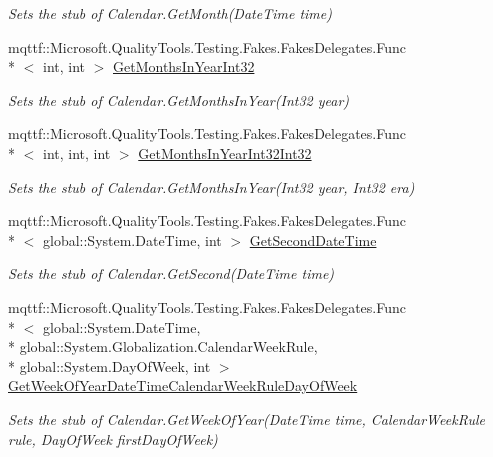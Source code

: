 \begin{DoxyCompactItemize}
\begin{DoxyCompactList}\small\item\em Sets the stub of Calendar.\-Get\-Month(\-Date\-Time time)\end{DoxyCompactList}\item 
mqttf\-::\-Microsoft.\-Quality\-Tools.\-Testing.\-Fakes.\-Fakes\-Delegates.\-Func\\*
$<$ int, int $>$ \hyperlink{class_system_1_1_globalization_1_1_fakes_1_1_stub_calendar_a66e55f25dc68ad269e2ca7e091b98267}{Get\-Months\-In\-Year\-Int32}
\begin{DoxyCompactList}\small\item\em Sets the stub of Calendar.\-Get\-Months\-In\-Year(\-Int32 year)\end{DoxyCompactList}\item 
mqttf\-::\-Microsoft.\-Quality\-Tools.\-Testing.\-Fakes.\-Fakes\-Delegates.\-Func\\*
$<$ int, int, int $>$ \hyperlink{class_system_1_1_globalization_1_1_fakes_1_1_stub_calendar_a3fb92cf91327ffaa04caa55f25961652}{Get\-Months\-In\-Year\-Int32\-Int32}
\begin{DoxyCompactList}\small\item\em Sets the stub of Calendar.\-Get\-Months\-In\-Year(\-Int32 year, Int32 era)\end{DoxyCompactList}\item 
mqttf\-::\-Microsoft.\-Quality\-Tools.\-Testing.\-Fakes.\-Fakes\-Delegates.\-Func\\*
$<$ global\-::\-System.\-Date\-Time, int $>$ \hyperlink{class_system_1_1_globalization_1_1_fakes_1_1_stub_calendar_a8a6e91ba959bb49a08e6d847e71fc9c2}{Get\-Second\-Date\-Time}
\begin{DoxyCompactList}\small\item\em Sets the stub of Calendar.\-Get\-Second(\-Date\-Time time)\end{DoxyCompactList}\item 
mqttf\-::\-Microsoft.\-Quality\-Tools.\-Testing.\-Fakes.\-Fakes\-Delegates.\-Func\\*
$<$ global\-::\-System.\-Date\-Time, \\*
global\-::\-System.\-Globalization.\-Calendar\-Week\-Rule, \\*
global\-::\-System.\-Day\-Of\-Week, int $>$ \hyperlink{class_system_1_1_globalization_1_1_fakes_1_1_stub_calendar_a8c9034c6b0a71419dec2c4434683dff3}{Get\-Week\-Of\-Year\-Date\-Time\-Calendar\-Week\-Rule\-Day\-Of\-Week}
\begin{DoxyCompactList}\small\item\em Sets the stub of Calendar.\-Get\-Week\-Of\-Year(\-Date\-Time time, Calendar\-Week\-Rule rule, Day\-Of\-Week first\-Day\-Of\-Week)\end{DoxyCompactList}\item 

\end{DoxyCompactItemize}
